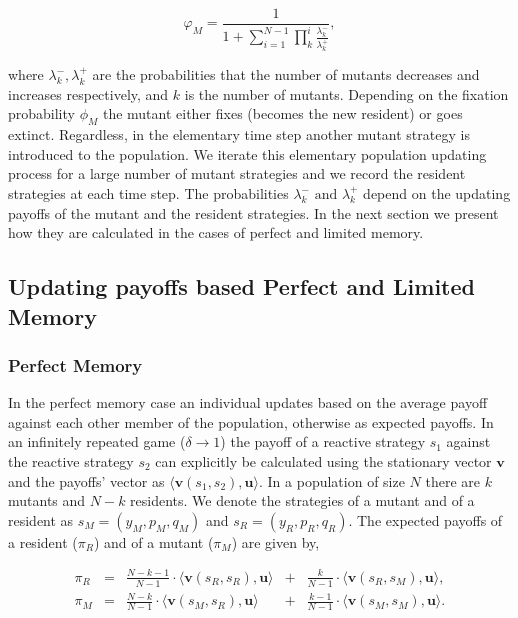 \documentclass[11pt]{article}
\theoremstyle{plainCl1}
\theoremstyle{plainCl2}
\begin{document}
\begin{equation}\label{eq:appendix_fixation_probability}
    \varphi_{M} = \frac{1}{1+\sum\limits_{i=1}^{N-1}\prod\limits_k^i \frac{\lambda^-_k}{\lambda^+_k}},
\end{equation}

where \(\lambda^-_k, \lambda^+_k\) are the probabilities that the number of
mutants decreases and increases respectively, and \(k\) is the number of
mutants. Depending on the fixation probability \(\phi_{M}\) the mutant either
fixes (becomes the new resident) or goes extinct. Regardless, in the elementary
time step another mutant strategy is introduced to the population. We iterate
this elementary population updating process for a large number of mutant
strategies and we record the resident strategies at each time step. The
probabilities \(\lambda^-_k \text{ and } \lambda^+_k\) depend on the updating
payoffs of the mutant and the resident strategies. In the next section we
present how they are calculated in the cases of perfect and limited memory.

\subsection{Updating payoffs based Perfect and Limited Memory}

\subsubsection*{Perfect Memory}

In the perfect memory case an individual updates based on the average payoff
against each other member of the population, otherwise as expected payoffs. In
an infinitely repeated game ($\delta \rightarrow 1$) the payoff of a reactive
strategy \(s_1\) against the reactive strategy \(s_2\) can explicitly be
calculated using the stationary vector \(\mathbf{v}\) and the payoffs' vector as
\(\langle\mathbf{v}(s_1,s_2),\mathbf{u}\rangle\). In a population of size \(N\)
there are \(k\) mutants and \(N - k\) residents. We denote the strategies of
a mutant and of a resident as \(s_M =(y_M, p_M, q_M)\) and \(s_R =
(y_R, p_R, q_R)\). The expected payoffs of a resident (\(\pi_R\)) and of a
mutant (\(\pi_M\)) are given by,

\begin{equation} \label{Eq:ExpPay}
  \begin{array}{lcrcr}
  \displaystyle \pi_R & = &\displaystyle \frac{N\!-\!k\!-\!1}{N-1}\cdot \langle\mathbf{v}(s_R,s_R),\mathbf{u}\rangle	&+	&\displaystyle\frac{k}{N-1}\cdot \langle\mathbf{v}(s_R,s_M),\mathbf{u}\rangle,\\[0.5cm]
  \displaystyle \pi_M & = &\displaystyle\frac{N-k}{N-1}\cdot \langle\mathbf{v}(s_M,s_R),\mathbf{u}\rangle&+	&\displaystyle\frac{k-1}{N-1}\cdot \langle\mathbf{v}(s_M,s_M),\mathbf{u}\rangle.\\
  \end{array}
\end{equation}
\end{document}
